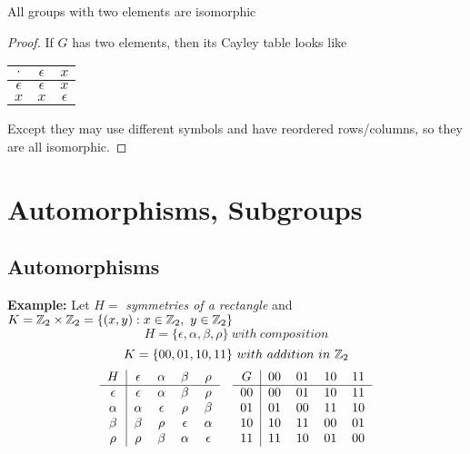 \documentclass[openany]{report}
\begin{document}
\begin{prop}
    All groups with two elements are isomorphic
\end{prop}
\begin{proof}
    If $G$ has two elements, then its Cayley table looks like 
    \begin{center}
         \begin{tabular}{c|cc}
        $\cdot$ & $\epsilon$ & $x$ \\
        \hline
        $\epsilon$ & $\epsilon$ & $x$\\
        $x$ & $x$ & $\epsilon$
    \end{tabular}   
    \end{center}
    Except they may use different symbols and have reordered rows/columns, so they are all isomorphic.
\end{proof}
\chapter{Automorphisms, Subgroups}
\section{Automorphisms}
\textbf{Example:}
Let $H = $ \textit{symmetries of a rectangle} and $K = \mathbb{Z}_2 \times \mathbb{Z}_2 = \{(x,y): x\in \mathbb{Z}_2, \ y\in\mathbb{Z}_2\}$
$$H = \{\epsilon, \alpha, \beta, \rho\} \ with \ composition$$
$$K = \{00, 01, 10,11\} \ with \ addition \ in \ \ints_2$$
\begin{align*}
\begin{tabular}{c|cccc}
     $H$& $\epsilon$ & $\alpha$ & $\beta$ &$\rho$  \\
     \hline
     $\epsilon$ & $\epsilon$ & $\alpha$ & $\beta$ & $\rho$\\
     $\alpha$ & $\alpha$ & $\epsilon$ & $\rho$ & $\beta $\\
     $\beta$ & $\beta$ & $\rho$ & $\epsilon$ & $\alpha$\\
     $\rho$ & $\rho$ & $\beta$ & $\alpha$ & $\epsilon$  
\end{tabular}&&
\begin{tabular}{c|cccc}
     $G$& $00$ & $01$ & $10$ &$11$  \\
     \hline
     $00$ & $00$ & $01$ & $10$ & $11$\\
     $01$ & $01$ & $00$ & $11$ & $10 $\\
     $10$ & $10$ & $11$ & $00$ & $01$\\
     $11$ & $11$ & $10$ & $01$ & $00$  
\end{tabular}\\
\end{align*}
\end{document}
